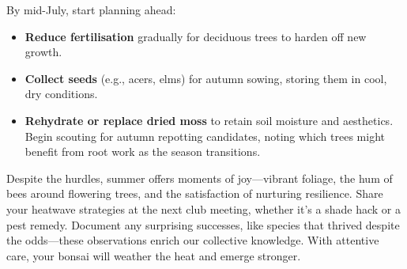 \medskip  
{}  
\noindent  
By mid\--July, start planning ahead:  
\begin{itemize}
    \item \textbf{Reduce fertilisation} gradually for deciduous trees to harden off new growth.  

    \vspace{-0.5em}
    \item \textbf{Collect seeds} (e.g., acers, elms) for autumn sowing, storing them in cool, dry conditions.  

    \vspace{-0.5em}
    \item \textbf{Rehydrate or replace dried moss} to retain soil moisture and aesthetics.
    Begin scouting for autumn repotting candidates, noting which trees might benefit from root work as the season transitions.
\end{itemize}

\vspace{-0.5em}
\noindent  
Despite the hurdles, summer offers moments of joy---vibrant foliage, the hum of bees around flowering trees, and the satisfaction of nurturing resilience.
Share your heatwave strategies at the next club meeting, whether it's a shade hack or a pest remedy.
Document any surprising successes, like species that thrived despite the odds---these observations enrich our collective knowledge.
With attentive care, your bonsai will weather the heat and emerge stronger.
\closearticle
\columnbreak  

